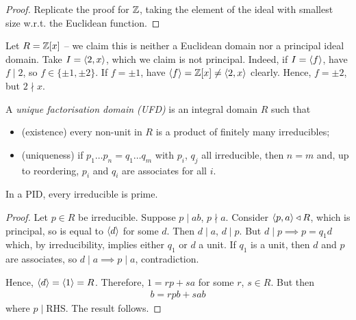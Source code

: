 \documentclass{../../template/note}
\begin{document}
    \begin{proof}
        Replicate the proof for $\mathbb Z$, taking the element of the ideal with smallest size w.r.t. the Euclidean function.
    \end{proof}
    
    \begin{example*}
        Let $R = \mathbb Z[x]$ -- we claim this is neither a Euclidean domain nor a principal ideal domain. Take $I = \left \langle 2, x \right \rangle$, which we claim is not principal. Indeed, if $I = \left \langle f \right \rangle$, have $f \mid 2$, so $f \in \{\pm 1, \pm 2\}$. If $f = \pm 1$, have $\left \langle f \right \rangle = \mathbb Z[x] \neq \left \langle 2, x \right \rangle$ clearly. Hence, $f = \pm 2$, but $2 \nmid x$.
    \end{example*}
    
    \begin{definition}
        A \emph{unique factorisation domain (UFD)} is an integral domain $R$ such that
        \begin{itemize}
            \item (existence) every non-unit in $R$ is a product of finitely many irreducibles;
            \item (uniqueness) if $p_1\dots p_n = q_1 \dots q_m$ with $p_i$, $q_j$ all irreducible, then $n=m$ and, up to reordering, $p_i$ and $q_i$ are associates for all $i$.
        \end{itemize}
    \end{definition}
    
    \begin{lemma}
        In a PID, every irreducible is prime.
    \end{lemma}
    
    \begin{proof}
        Let $p \in R$ be irreducible. Suppose $p \mid ab$, $p \nmid a$. Consider $\left \langle p, a \right \rangle \triangleleft R$, which is principal, so is equal to $\left \langle d \right \rangle$ for some $d$. Then $d \mid a$, $d \mid p$. But $d \mid p \implies p = q_1d$ which, by irreducibility, implies either $q_1$ or $d$ a unit. If $q_1$ is a unit, then $d$ and $p$ are associates, so $d \mid a \implies p \mid a$, contradiction.

        Hence, $\left \langle d \right \rangle = \left \langle 1 \right \rangle = R$. Therefore, $1 = rp + sa$ for some $r$, $s \in R$. But then
        \begin{align*}
            b = rpb + sab
        \end{align*}
        where $p \mid \text{RHS}$. The result follows.        
    \end{proof}
    
\end{document}
